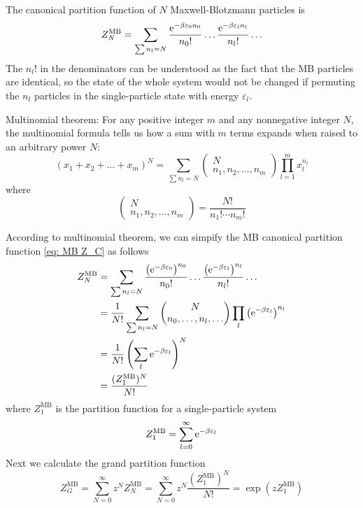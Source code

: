 \documentclass[10pt]{article}
\begin{document}
The canonical partition function of $N$ Maxwell-Blotzmann particles is
\begin{equation}
	Z_N^{\mathrm{MB}} = \sum_{\sum n_l = N} \frac{\e^{-\beta \varepsilon_0 n_0}}{n_0 !} \dots \frac{\e^{-\beta \varepsilon_l n_l}}{n_l !} \dots \label{eq: MB Z_C}
\end{equation}
The $n_l !$ in the denominators can be understood as the fact that the MB particles are identical, so the state of the whole system would not be changed if permuting the $n_l$ particles in the single-particle state with energy $\varepsilon_l$.
\begin{theorem}
	Multinomial theorem: For any positive integer $m$ and any nonnegative integer $N$, the multinomial formula tells us how a sum with $m$ terms expands when raised to an arbitrary power $N$:
	\begin{equation}
		(x_1 + x_2 + \dots + x_m)^N = \sum_{\sum n_l = N}
		\begin{pmatrix}
			N \\
			n_1, n_2, \dots, n_m
		\end{pmatrix}
		\prod_{l = 1}^{m} x_l^{n_l}
	\end{equation}
	where
	\begin{equation}
		\begin{pmatrix}
			N \\
			n_1, n_2, \dots, n_m
		\end{pmatrix}
		= \frac{N!}{n_1! \cdots n_m!}
	\end{equation}
\end{theorem}
According to multinomial theorem, we can simpify the MB canonical partition function \eqref{eq: MB Z_C} as follows
\begin{align*}
	Z_N^{\mathrm{MB}} &= \sum_{\sum n_l = N} \frac{\left({\mathrm{e}}^{-\beta \varepsilon_0}\right)^{n_0}}{n_0 !} \dots \frac{\left({\mathrm{e}}^{-\beta \varepsilon_l}\right)^{n_l}}{n_l !} \dots \\
	&= \frac{1}{N!} \sum_{\sum n_l = N}
	\begin{pmatrix}
		N \\
		n_0, \dots, n_l, \dots
	\end{pmatrix}
	\prod_l \left({\mathrm{e}}^{-\beta \varepsilon_l}\right)^{n_l} \\
	&= \frac{1}{N!} \left(\sum_l {\mathrm{e}}^{-\beta \varepsilon_l}\right)^{N} \\
	&= \frac{(Z_1^{\mathrm{MB}})^N}{N!}
\end{align*}
where $Z_1^{\mathrm{MB}}$ is the partition function for a single-particle system
\begin{equation}
	Z_1^{\mathrm{MB}} = \sum_{l=0}^{\infty} {\mathrm{e}}^{-\beta \varepsilon_l}
\end{equation}
Next we calculate the grand partition function
\begin{equation}
	Z_G^{\mathrm{MB}} = \sum_{N=0}^{\infty} z^N Z_N^{\mathrm{MB}} = \sum_{N=0}^{\infty} z^N \frac{(Z_1^{\mathrm{MB}})^N}{N!} = \exp\left(z Z_1^{\mathrm{MB}}\right)
\end{equation}
\end{document}
